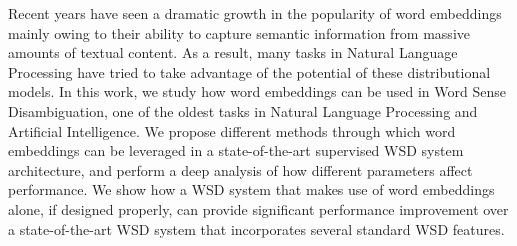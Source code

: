 Recent years have seen a dramatic growth in the popularity of word embeddings mainly owing to their ability to capture semantic information from massive amounts of textual content. As a result, many tasks in Natural Language Processing have tried to take advantage of the potential of these distributional models. In this work, we study how word embeddings can be used in Word Sense Disambiguation, one of the oldest tasks in Natural Language Processing and Artificial Intelligence. We propose different methods through which word embeddings can be leveraged in a state-of-the-art supervised WSD system architecture, and perform a deep analysis of how different parameters affect performance. We show how a WSD system that makes use of word embeddings alone, if designed properly, can provide significant performance improvement over a state-of-the-art WSD system that incorporates several standard WSD features.
